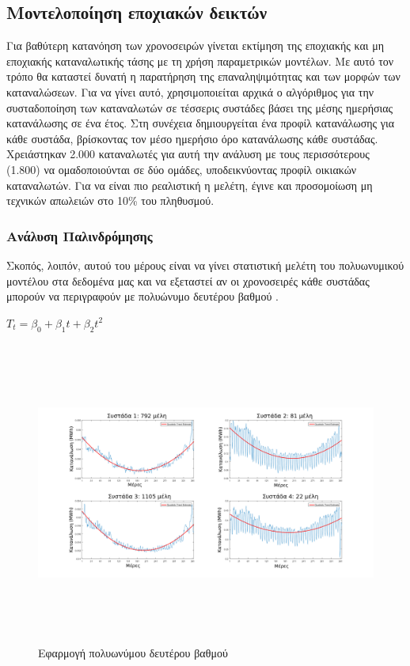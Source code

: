 \subsection{Μοντελοποίηση εποχιακών δεικτών}
\label{sec:statisticalexplore}
Για βαθύτερη κατανόηση των χρονοσειρών γίνεται εκτίμηση της εποχιακής και μη εποχιακής καταναλωτικής τάσης με τη χρήση παραμετρικών μοντέλων. Με αυτό τον τρόπο θα καταστεί δυνατή η παρατήρηση της επαναληψιμότητας και των μορφών των καταναλώσεων. Για να γίνει αυτό, χρησιμοποιείται αρχικά ο αλγόριθμος  για την συσταδοποίηση των καταναλωτών σε τέσσερις συστάδες βάσει της μέσης ημερήσιας κατανάλωσης σε ένα έτος. Στη συνέχεια δημιουργείται ένα προφίλ κατανάλωσης για κάθε συστάδα, βρίσκοντας τον μέσο ημερήσιο όρο κατανάλωσης κάθε συστάδας. Χρειάστηκαν 2.000 καταναλωτές για αυτή την ανάλυση με τους περισσότερους (1.800) να ομαδοποιούνται σε δύο ομάδες, υποδεικνύοντας προφίλ οικιακών καταναλωτών. Για να είναι πιο ρεαλιστική η μελέτη, έγινε και προσομοίωση μη τεχνικών απωλειών στο 10\% του πληθυσμού.
\subsubsection{Ανάλυση Παλινδρόμησης}
Σκοπός, λοιπόν, αυτού του μέρους είναι να γίνει στατιστική μελέτη του πολυωνυμικού μοντέλου στα δεδομένα μας και να εξεταστεί αν οι χρονοσειρές κάθε συστάδας μπορούν να περιγραφούν  με πολυώνυμο δευτέρου βαθμού \cite{mathworkstrend}. \par
\begin{center}
$T_t=\beta_0 + \beta_1t + \beta_2t^2$
\end{center}

\begin{figure}[ht!]
\centering
\includegraphics[width=180mm, height=100mm]{../../plots/Trend_estimation/gr_quadratic_Trend_ALL.png}
\caption{Εφαρμογή πολυωνύμου δευτέρου  βαθμού}
\label{fig:quadratic trend}
\end{figure}


